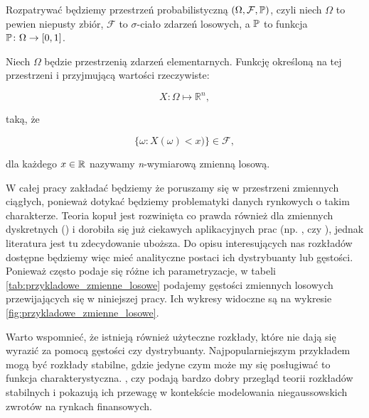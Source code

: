 Rozpatrywać będziemy przestrzeń probabilistyczną $(\Omega,\mathcal{F},\mathbb{P})$, czyli niech $\Omega$ to pewien niepusty zbiór, $\mathcal{F}$ to $\sigma$-ciało zdarzeń losowych, a $\mathbb{P}$ to funkcja $\mathbb{P}\colon\Omega\rightarrow[0,1]$. 

\begin{df}
	\label{df:n_wym_zmienna_losowa}
	Niech $\Omega$ będzie przestrzenią zdarzeń elementarnych. Funkcję określoną na tej przestrzeni i przyjmującą wartości rzeczywiste:
	
	$$ X\colon \Omega \mapsto \mathbb{R}^{n}, $$

	taką, że
	
	$$ \{ \omega \colon X(\omega) < x) \} \in \mathcal{F},$$
	
	dla każdego $x \in \mathbb{R}$ nazywamy \textit{n}-wymiarową zmienną losową.
\end{df}

W całej pracy zakładać będziemy że poruszamy się w przestrzeni zmiennych ciągłych, ponieważ dotykać będziemy problematyki danych rynkowych o takim charakterze. Teoria kopuł jest rozwinięta co prawda również dla zmiennych dyskretnych (\cite{Genest_Discrete_Copulas}) i dorobiła się już ciekawych aplikacyjnych prac (np. \cite{Koopman_DiscreteCopula_HTF}, czy \cite{Shefzik_Weather}), jednak literatura jest tu zdecydowanie uboższa. Do opisu interesujących nas rozkładów dostępne będziemy więc mieć analityczne postaci ich dystrybuanty lub gęstości. Ponieważ często podaje się różne ich parametryzacje, w tabeli \ref{tab:przykladowe_zmienne_losowe} podajemy gęstości zmiennych losowych przewijających się w niniejszej pracy. Ich wykresy widoczne są na wykresie \ref{fig:przykladowe_zmienne_losowe}.

Warto wspomnieć, że istnieją również użyteczne rozkłady, które nie dają się wyrazić za pomocą gęstości czy dystrybuanty. Najpopularniejszym przykładem mogą być rozkłady stabilne, gdzie jedyne czym może my się posługiwać to funkcja charakterystyczna.  \cite{Stable_Distributions1}, czy \cite{Stable_Distributions2} podają bardzo dobry przegląd teorii rozkładów stabilnych i pokazują ich przewagę w kontekście modelowania niegaussowskich zwrotów na rynkach finansowych.

